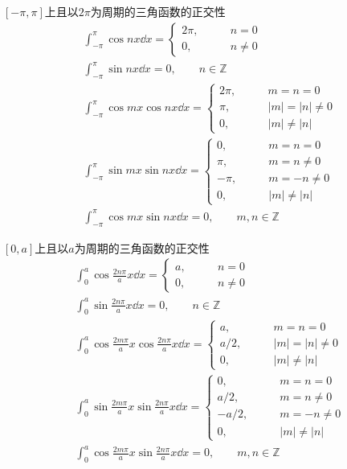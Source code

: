 \documentclass[lang = cn, scheme = chinese, thmcnt = section]{elegantbook}
\newcommand{\Z}{\mathbb{Z}}            %
\begin{document}
\begin{theorem}{$[-\pi,\pi]$上且以$2\pi$为周期的三角函数的正交性}
	\begin{align*}
		& \int_{-\pi}^{\pi}\cos nx\dd x=\begin{cases}
			2\pi,\qquad & n=0\\
			0,\qquad & n\ne 0
		\end{cases}\\
		& \int_{-\pi}^{\pi}\sin nx\dd x=0,\qquad n\in\Z\\
		& \int_{-\pi}^{\pi}\cos mx\cos nx \dd x=\begin{cases}
			2\pi,\qquad & m=n=0\\
			\pi,\qquad & |m|=|n|\ne 0\\
			0,\qquad & |m|\ne |n|
		\end{cases}\\
		& \int_{-\pi}^{\pi}\sin mx\sin nx \dd x=\begin{cases}
			0,\qquad & m=n=0\\
			\pi,\qquad & m=n\ne 0\\
			-\pi,\qquad & m=-n\ne 0\\
			0,\qquad & |m|\ne |n|
		\end{cases}\\
		& \int_{-\pi}^{\pi}\cos mx\sin nx\dd x=0,\qquad m,n\in\Z
	\end{align*}
\end{theorem}

\begin{theorem}{$[0,a]$上且以$a$为周期的三角函数的正交性}
	\begin{align*}
		& \int_{0}^{a}\cos \frac{2n\pi}{a}x\dd x=\begin{cases}
			a,\qquad & n=0\\
			0,\qquad & n\ne 0
		\end{cases}\\
		& \int_{0}^{a}\sin \frac{2n\pi}{a}x\dd x=0,\qquad n\in\Z\\
		& \int_{0}^{a}\cos \frac{2m\pi}{a}x\cos \frac{2n\pi}{a}x \dd x=\begin{cases}
			a,\qquad & m=n=0\\
			a/2,\qquad & |m|=|n|\ne 0\\
			0,\qquad & |m|\ne |n|
		\end{cases}\\
		& \int_{0}^{a}\sin \frac{2m\pi}{a}x\sin \frac{2n\pi}{a}x \dd x=\begin{cases}
			0,\qquad & m=n=0\\
			a/2,\qquad & m=n\ne 0\\
			-a/2,\qquad & m=-n\ne 0\\
			0,\qquad & |m|\ne |n|
		\end{cases}\\
		& \int_{0}^{a}\cos \frac{2m\pi}{a}x\sin \frac{2n\pi}{a}x\dd x=0,\qquad m,n\in\Z
	\end{align*}
\end{theorem}
\end{document}
